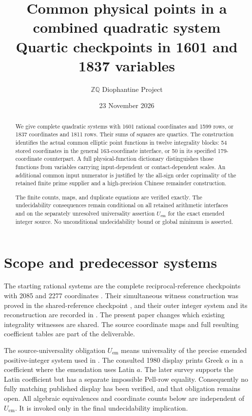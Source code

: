\documentclass[11pt]{article}
\title{Common physical points in a combined quadratic system\\
Quartic checkpoints in 1601 and 1837 variables}
\author{\(\mathbb Z\mathbb Q\) Diophantine Project}
\date{23 November 2026}
\begin{document}
\maketitle
\begin{abstract}
We give complete quadratic systems with 1601 rational coordinates and
1599 rows, or 1837 coordinates and 1811 rows. Their sums of squares are
quartics. The construction identifies the actual common elliptic point
functions in twelve integrality blocks: 54 stored coordinates in the
general 163-coordinate interface, or 50 in its specified 179-coordinate
counterpart. A full physical-function dictionary distinguishes those
functions from variables carrying input-dependent or contact-dependent
scales. An additional common input numerator is justified by the
all-sign order coprimality of the retained finite prime supplier and a
high-precision Chinese remainder construction.

The finite counts, maps, and duplicate equations are verified exactly.
The undecidability consequences remain conditional on all retained
arithmetic interfaces and on the separately unresolved universality
assertion \(U_{\mathrm{em}}\) for the exact emended integer source.
No unconditional undecidability bound or global minimum is asserted.
\end{abstract}

\section{Scope and predecessor systems}

The starting rational systems are the complete reciprocal-reference
checkpoints with 2085 and 2277 coordinates \cite{reciprocal}. Their
simultaneous witness construction was proved in the shared-reference
checkpoint \cite{shared}, and their outer integer system and its
reconstruction are recorded in \cite{outer}. The present paper changes
which existing integrality witnesses are shared. The source coordinate
maps and full resulting coefficient tables are part of the deliverable.

The source-universality obligation \(U_{\mathrm{em}}\) means universality
of the precise emended positive-integer system used in \cite{outer}.
The consulted 1980 display prints Greek \(\alpha\) in a coefficient
where the emendation uses Latin \(a\). The later survey supports the
Latin coefficient but has a separate impossible Pell-row equality.
Consequently no fully matching published display has been verified,
and that obligation remains open. All algebraic equivalences and
coordinate counts below are independent of \(U_{\mathrm{em}}\).
It is invoked only in the final undecidability implication.
\end{document}

